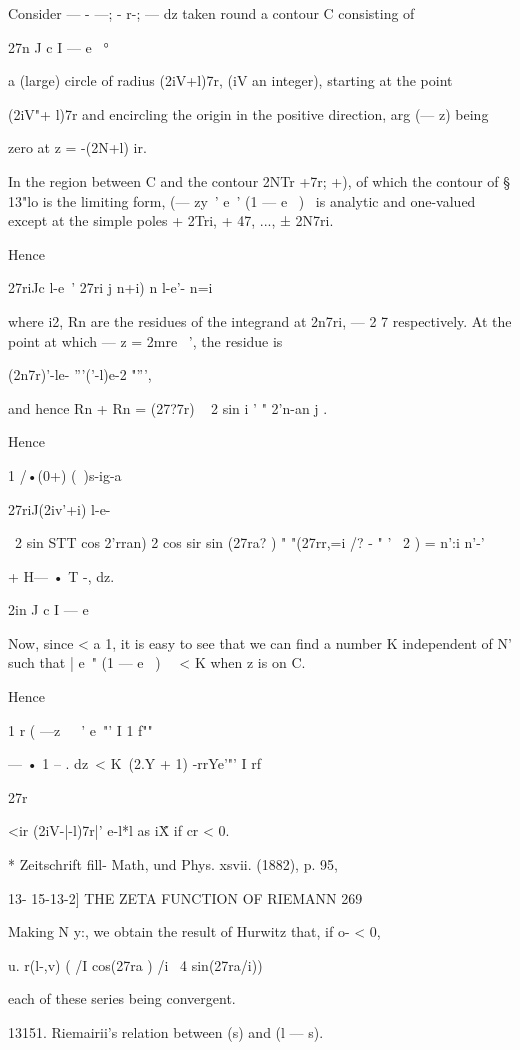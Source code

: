 Consider — - —; - r-; — dz taken round a contour C consisting of

27n J c I — e~ °

a (large) circle of radius (2iV+l)7r, (iV an integer), starting at the
point

(2iV"+ l)7r and encircling the origin in the positive direction, arg
(— z) being

zero at z = -(2N+l) ir.

In the region between C and the contour 2NTr +7r; +), of which the
contour of § 13"lo is the limiting form, (— zy~' e~' (1 — e~ )~ is
analytic and one-valued except at the simple poles + 2Tri, + 47, ...,
± 2N7ri.

Hence

27riJc l-e~' 27ri j n+i) n l-e'- n=i

where i2, Rn are the residues of the integrand at 2n7ri, — 2 7
respectively. At the point at which — z = 2mre~ ', the residue is

(2n7r)'-le- '''('-l)e-2 "''',

and hence Rn + Rn = (27?7r) ~ 2 sin i ' " 2'n-an j .

Hence

1 /•(0+) (\ )s-ig-a

27riJ(2iv'+i) l-e-

\ 2 sin STT cos 2'rran) 2 cos sir sin (27ra? ) " "(27rr,=i /? - " ' \
2 ) = n':i n'-'

+ H— • T -, dz.

2in J c I — e

Now, since < a 1, it is easy to see that we can find a number K
independent of N' such that | e~" (1 — e~ )~ \ < K when z is on C.

Hence

1 r ( —z\ \ ~' e~"' I 1 f""

— • 1 -- . dz\ < K\, (2.Y + 1) -rrYe'"' I rf

27r

<ir (2iV-|-l)7r|' e-l*l as i\" X if cr < 0.

* Zeitschrift fill- Math, und Phys. xsvii. (1882), p. 95,

13- 15-13-2] THE ZETA FUNCTION OF RIEMANN 269

Making N y:, we obtain the result of Hurwitz that, if o- < 0,

 u. r(l-,v) ( /I cos(27ra ) /i \ 4 sin(27ra/i))

each of these series being convergent.

13151. Riemairii's relation between (s) and (l — s).

